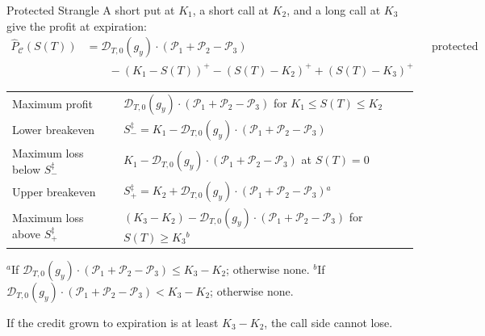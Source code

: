 \documentclass[aspectratio=169,11pt]{beamer}
\newcommand{\Cc}{\mathcal{C}}
\newcommand{\Dc}{\mathcal{D}}
\newcommand{\Pc}{\mathcal{P}}
\begin{document}
\begin{frame}{Protected Strangle}
  A short put at $K_{1}$, a short call at $K_{2}$, and a long call at $K_{3}$
  give the profit at expiration:
  \begin{align*}
    \hat{P}_{\Cc}(S(T)) &= \Dc_{T,0}(g_{y})\cdot(\Pc_{1}+\Pc_{2}-\Pc_{3}) && \text{protected strangle}\\
    &\qquad-(K_{1}-S(T))^{+}-(S(T)-K_{2})^{+}+(S(T)-K_{3})^{+}
  \end{align*}
  \begin{center}\footnotesize
    \begin{tabular}{ll}
      \toprule
      Maximum profit & $\Dc_{T,0}(g_{y})\cdot(\Pc_{1}+\Pc_{2}-\Pc_{3})$ for $K_{1}\leq S(T)\leq K_{2}$ \\
      Lower breakeven & $S^{\ddagger}_{-}=K_{1}-\Dc_{T,0}(g_{y})\cdot(\Pc_{1}+\Pc_{2}-\Pc_{3})$ \\
      Maximum loss below $S^{\ddagger}_{-}$ & $K_{1}-\Dc_{T,0}(g_{y})\cdot(\Pc_{1}+\Pc_{2}-\Pc_{3})$ at $S(T)=0$ \\
      Upper breakeven & $S^{\ddagger}_{+}=K_{2}+\Dc_{T,0}(g_{y})\cdot(\Pc_{1}+\Pc_{2}-\Pc_{3})$${}^{a}$ \\
      Maximum loss above $S^{\ddagger}_{+}$ & $(K_{3}-K_{2})-\Dc_{T,0}(g_{y})\cdot(\Pc_{1}+\Pc_{2}-\Pc_{3})$ for $S(T)\geq K_{3}$${}^{b}$ \\
      \bottomrule
    \end{tabular}
  \end{center}
  {\footnotesize ${}^{a}$If $\Dc_{T,0}(g_{y})\cdot(\Pc_{1}+\Pc_{2}-\Pc_{3})\leq K_{3}-K_{2}$; otherwise none. ${}^{b}$If $\Dc_{T,0}(g_{y})\cdot(\Pc_{1}+\Pc_{2}-\Pc_{3})<K_{3}-K_{2}$; otherwise none.\par}
  \vspace{0.3em}
  If the credit grown to expiration is at least $K_{3}-K_{2}$, the call side
  cannot lose.
\end{frame}
\end{document}
